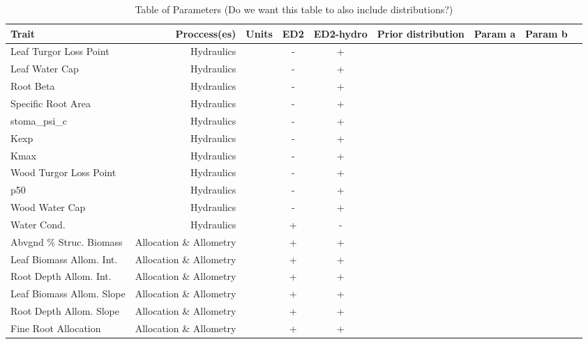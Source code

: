 
\begin{table}[!htp]\centering
\caption{Table of Parameters (Do we want this table to also include distributions?)}\label{tab:params}
\scriptsize
\begin{tabular}{lrrcc|rrrr}\toprule
Trait &Proccess(es) &Units &ED2 &ED2-hydro &Prior distribution &Param a &Param b \\\midrule
Leaf Turgor Loss Point &Hydraulics & &- &+ & & & \\
Leaf Water Cap &Hydraulics & &- &+ & & & \\
Root Beta &Hydraulics & &- &+ & & & \\
Specific Root Area &Hydraulics & &- &+ & & & \\
stoma_psi_c &Hydraulics & &- &+ & & & \\
Kexp &Hydraulics & &- &+ & & & \\
Kmax &Hydraulics & &- &+ & & & \\
Wood Turgor Loss Point &Hydraulics & &- &+ & & & \\
p50 &Hydraulics & &- &+ & & & \\
Wood Water Cap &Hydraulics & &- &+ & & & \\
Water Cond. &Hydraulics & &+ &- & & & \\
Abvgnd \% Struc. Biomass &Allocation \& Allometry & &+ &+ & & & \\
Leaf Biomass Allom. Int. &Allocation \& Allometry & &+ &+ & & & \\
Root Depth Allom. Int. &Allocation \& Allometry & &+ &+ & & & \\
Leaf Biomass Allom. Slope &Allocation \& Allometry & &+ &+ & & & \\
Root Depth Allom. Slope &Allocation \& Allometry & &+ &+ & & & \\
Fine Root Allocation &Allocation \& Allometry & &+ &+ & & & \\

\end{tabular}
\end{table}
